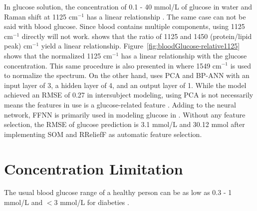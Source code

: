 In glucose solution, the concentration of 0.1 - 40 mmol/L of glucose in water and Raman shift at 1125 $\text{cm}^{-1}$ has a linear relationship \cite{solutionGlucose}.
The same case can not be said with blood glucose.
Since blood contains multiple components, using 1125 $\text{cm}^{-1}$ directly will not work. 
\cite{directGlucose} shows that the ratio of 1125 and 1450 (protein/lipid peak) $\text{cm}^{-1}$ yield a linear relationship.
Figure~\ref{fig:bloodGlucose-relative1125} shows that the normalized 1125 $\text{cm}^{-1}$ has a linear relationship with the glucose concentration.
This same procedure is also presented in \citep{solutionGlucose} where 1549 $\text{cm}^{-1}$ is used to normalize the spectrum.
On the other hand, \cite{ramanNailFold2019} uses PCA and BP-ANN with an input layer of 3, a hidden layer of 4, and an output layer of 1. 
While the model achieved an RMSE of 0.27 in intersubject modeling, using PCA is not necessarily means the features in use is a glucose-related feature \citep{directGlucose}.
Adding to the neural network, FFNN is primarily used in modeling glucose in \citep{sitecompare}. 
Without any feature selection, the RMSE of glucose prediction is 3.1 mmol/L and 30.12 mmol after implementing SOM and RReliefF as automatic feature selection.




\section{Concentration Limitation}

The usual blood glucose range of a healthy person can be as low as 0.3 - 1 mmol/L and $<$3 mmol/L for diabeties \citep{solutionGlucose}.


